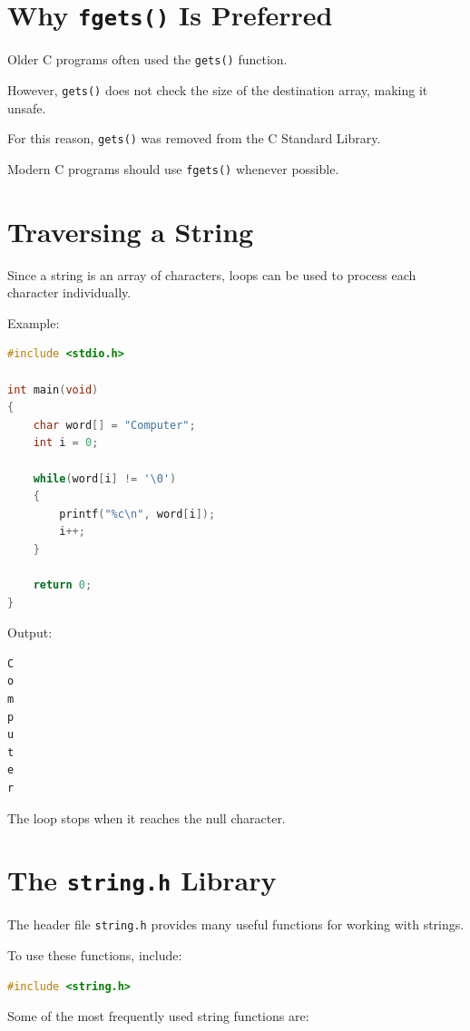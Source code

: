 \documentclass[12pt,openany]{book}
\begin{document}
\section{Why \texttt{fgets()} Is Preferred}

Older C programs often used the \texttt{gets()} function.

However, \texttt{gets()} does not check the size of the destination array, making it unsafe.

For this reason, \texttt{gets()} was removed from the C Standard Library.

Modern C programs should use \texttt{fgets()} whenever possible.

\section{Traversing a String}

Since a string is an array of characters, loops can be used to process each character individually.

Example:

\begin{lstlisting}[language=C]
#include <stdio.h>

int main(void)
{
    char word[] = "Computer";
    int i = 0;

    while(word[i] != '\0')
    {
        printf("%c\n", word[i]);
        i++;
    }

    return 0;
}
\end{lstlisting}

Output:

\begin{lstlisting}
C
o
m
p
u
t
e
r
\end{lstlisting}

The loop stops when it reaches the null character.

\section{The \texttt{string.h} Library}

The header file \texttt{string.h} provides many useful functions for working with strings.

To use these functions, include:

\begin{lstlisting}[language=C]
#include <string.h>
\end{lstlisting}

Some of the most frequently used string functions are:
\end{document}
